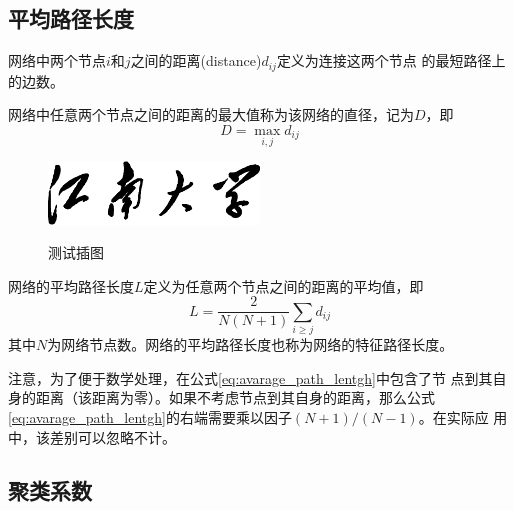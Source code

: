 \documentclass[phd]{jnuthesis}
\begin{document}
\subsection{平均路径长度}

\begin{definition}[节点之间的距离]
网络中两个节点$i$和$j$之间的距离(distance)$d_{ij}$定义为连接这两个节点
的最短路径上的边数。
\end{definition}

\begin{definition}[直径]
网络中任意两个节点之间的距离的最大值称为该网络的直径，记为$D$，即
\begin{equation}\label{eq:dimension}
    D = \max_{i,j} d_{ij}
\end{equation}
\end{definition}


\begin{figure}[htbp]
  \centering
  \includegraphics[width= 0.5\textwidth]{jnuname.eps}\\
  \caption{测试插图}\label{fig:test3}
\end{figure}

\begin{definition}[平均路径长度]
网络的平均路径长度$L$定义为任意两个节点之间的距离的平均值，即
\begin{equation}\label{eq:avarage_path_lentgh}
    L = \frac{2}{N(N+1)}\sum_{i\geq j}d_{ij}
\end{equation}
其中$N$为网络节点数。网络的平均路径长度也称为网络的特征路径长度。
\end{definition}

注意，为了便于数学处理，在公式\eqref{eq:avarage_path_lentgh}中包含了节
点到其自身的距离（该距离为零）。如果不考虑节点到其自身的距离，那么公式
\eqref{eq:avarage_path_lentgh}的右端需要乘以因子$(N+1)/(N-1)$。在实际应
用中，该差别可以忽略不计。

\subsection{聚类系数}
\end{document}
